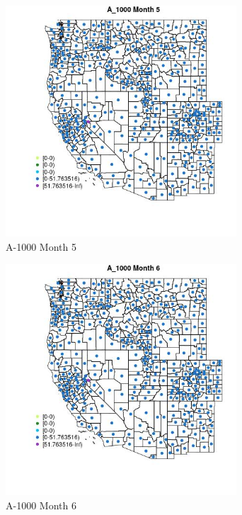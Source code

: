 \begin{figure} 
\centering  
\includegraphics[width=0.77\textwidth]{Code_Outputs/df_report_ML_predictors_CountyCentroid_Locations_Dates_2008-01-01to2018-12-31_MapObsMo5A_1000.jpg} 
\caption{\label{fig:df_report_ML_predictors_CountyCentroid_Locations_Dates_2008-01-01to2018-12-31MapObsMo5A_1000}A-1000 Month 5} 
\end{figure} 
 

\begin{figure} 
\centering  
\includegraphics[width=0.77\textwidth]{Code_Outputs/df_report_ML_predictors_CountyCentroid_Locations_Dates_2008-01-01to2018-12-31_MapObsMo6A_1000.jpg} 
\caption{\label{fig:df_report_ML_predictors_CountyCentroid_Locations_Dates_2008-01-01to2018-12-31MapObsMo6A_1000}A-1000 Month 6} 
\end{figure} 
 

